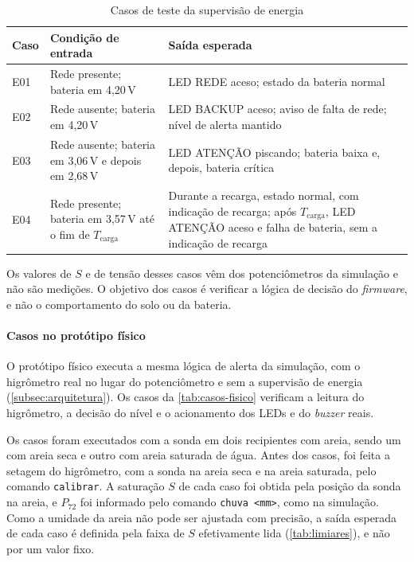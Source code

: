 \begin{table}[H]
\centering
\caption{Casos de teste da supervisão de energia}
\label{tab:casos-energia}
\small
\begin{tabular}{p{0.8cm}p{6.0cm}p{7.6cm}}
\hline
\textbf{Caso} & \textbf{Condição de entrada} & \textbf{Saída esperada} \\
\hline
E01 & Rede presente; bateria em 4,20\,V & LED REDE aceso; estado da bateria normal \\
E02 & Rede ausente; bateria em 4,20\,V & LED BACKUP aceso; aviso de falta de rede; nível de alerta mantido \\
E03 & Rede ausente; bateria em 3,06\,V e depois em 2,68\,V & LED ATENÇÃO piscando; bateria baixa e, depois, bateria crítica \\
E04 & Rede presente; bateria em 3,57\,V até o fim de $T_{\mathrm{carga}}$ & Durante a recarga, estado normal, com indicação de recarga; após $T_{\mathrm{carga}}$, LED ATENÇÃO aceso e falha de bateria, sem a indicação de recarga \\
\hline
\end{tabular}
\end{table}

Os valores de $S$ e de tensão desses casos vêm dos potenciômetros da
simulação e não são medições. O objetivo dos casos é verificar a lógica
de decisão do \textit{firmware}, e não o comportamento do solo ou da
bateria.

\paragraph*{Casos no protótipo físico}

O protótipo físico executa a mesma lógica de alerta da simulação, com o
higrômetro real no lugar do potenciômetro e sem a supervisão de energia
(\autoref{subsec:arquitetura}). Os casos da \autoref{tab:casos-fisico}
verificam a leitura do higrômetro, a decisão do nível e o acionamento dos
LEDs e do \textit{buzzer} reais.

Os casos foram executados com a sonda em dois recipientes com areia, sendo um com areia seca e outro com areia saturada de água. Antes dos casos,
foi feita a setagem do higrômetro, com a sonda na areia seca e na areia
saturada, pelo comando \texttt{calibrar}. A saturação $S$ de cada caso
foi obtida pela posição da sonda na areia, e $P_{72}$ foi informado pelo
comando \texttt{chuva <mm>}, como na simulação.
Como a umidade da areia não pode ser ajustada com precisão, a saída
esperada de cada caso é definida pela faixa de $S$ efetivamente lida
(\autoref{tab:limiares}), e não por um valor fixo.

